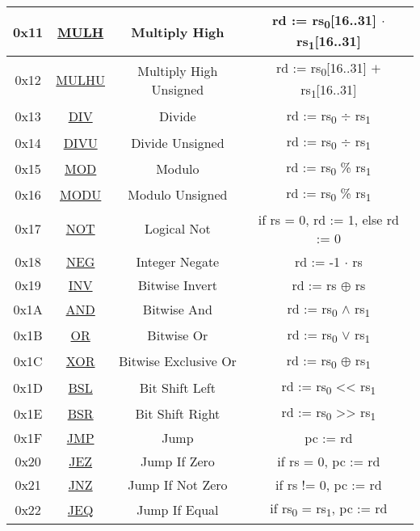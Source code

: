 \begin{center}
\begin{tabular}{|c|c|c|c|}
		\hline
		0x11 & \hyperref[sec:MULH]{MULH} & Multiply High & rd := rs\textsubscript{0}[16..31] $\cdot$ rs\textsubscript{1}[16..31]\\
		\hline
		0x12 & \hyperref[sec:MULHU]{MULHU} & Multiply High Unsigned & rd := rs\textsubscript{0}[16..31] $+$ rs\textsubscript{1}[16..31]\\
		\hline
		0x13 & \hyperref[sec:DIV]{DIV} & Divide & rd := rs\textsubscript{0} $\div$ rs\textsubscript{1}\\
		\hline
		0x14 & \hyperref[sec:DIVU]{DIVU} & Divide Unsigned & rd := rs\textsubscript{0} $\div$ rs\textsubscript{1}\\
		\hline
		0x15 & \hyperref[sec:MOD]{MOD} & Modulo & rd := rs\textsubscript{0} \% rs\textsubscript{1}\\
		\hline
		0x16 & \hyperref[sec:MODU]{MODU} & Modulo Unsigned & rd := rs\textsubscript{0} \% rs\textsubscript{1}\\
		\hline
		0x17 & \hyperref[sec:NOT]{NOT} & Logical Not & if rs = 0, rd := 1, else rd := 0\\
		\hline
		0x18 & \hyperref[sec:NEG]{NEG} & Integer Negate & rd := -1 $\cdot$ rs\\
		\hline
		0x19 & \hyperref[sec:INV]{INV} & Bitwise Invert & rd := rs $\oplus$ rs\\
		\hline
		0x1A & \hyperref[sec:AND]{AND} & Bitwise And & rd := rs\textsubscript{0} $\land$ rs\textsubscript{1}\\
		\hline
		0x1B & \hyperref[sec:OR]{OR} & Bitwise Or & rd := rs\textsubscript{0} $\lor$ rs\textsubscript{1}\\
		\hline
		0x1C & \hyperref[sec:XOR]{XOR} & Bitwise Exclusive Or & rd := rs\textsubscript{0} $\oplus$ rs\textsubscript{1}\\
		\hline
		0x1D & \hyperref[sec:BSL]{BSL} & Bit Shift Left & rd := rs\textsubscript{0} << rs\textsubscript{1}\\
		\hline
		0x1E & \hyperref[sec:BSR]{BSR} & Bit Shift Right & rd := rs\textsubscript{0} >> rs\textsubscript{1}\\
		\hline
		0x1F & \hyperref[sec:JMP]{JMP} & Jump & pc := rd\\
		\hline
		0x20 & \hyperref[sec:JEZ]{JEZ} & Jump If Zero & if rs = 0, pc := rd\\
		\hline
		0x21 & \hyperref[sec:JNZ]{JNZ} & Jump If Not Zero & if rs != 0, pc := rd\\
		\hline
		0x22 & \hyperref[sec:JEQ]{JEQ} & Jump If Equal & if rs\textsubscript{0} = rs\textsubscript{1}, pc := rd\\

\end{tabular}
\end{center}
